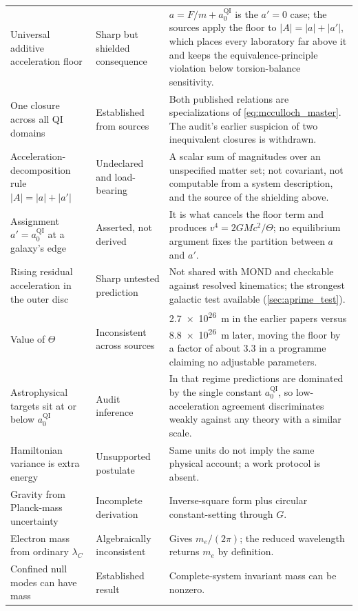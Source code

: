 \documentclass[11pt]{article}
\newcommand{\QI}{\mathrm{QI}}
\begin{document}
\begin{longtable}{>{\raggedright\arraybackslash}p{}>{\raggedright\arraybackslash}p{}>{\raggedright\arraybackslash}p{}}
Universal additive acceleration floor & Sharp but shielded consequence & \(a=F/m+a_{0}^{\QI}\) is the \(a'=0\) case; the sources apply the floor to \(|A|=|a|+|a'|\), which places every laboratory far above it and keeps the equivalence-principle violation below torsion-balance sensitivity. \\
One closure across all QI domains & Established from sources & Both published relations are specializations of \cref{eq:mcculloch_master}. The audit's earlier suspicion of two inequivalent closures is withdrawn. \\
Acceleration-decomposition rule \(|A|=|a|+|a'|\) & Undeclared and load-bearing & A scalar sum of magnitudes over an unspecified matter set; not covariant, not computable from a system description, and the source of the shielding above. \\
Assignment \(a'=a_{0}^{\QI}\) at a galaxy's edge & Asserted, not derived & It is what cancels the floor term and produces \(v^{4}=2GMc^{2}/\Theta\); no equilibrium argument fixes the partition between \(a\) and \(a'\). \\
Rising residual acceleration in the outer disc & Sharp untested prediction & Not shared with MOND and checkable against resolved kinematics; the strongest galactic test available (\cref{sec:aprime_test}). \\
Value of \(\Theta\) & Inconsistent across sources & \SI{2.7e26}{m} in the earlier papers versus \SI{8.8e26}{m} later, moving the floor by a factor of about \(3.3\) in a programme claiming no adjustable parameters. \\
Astrophysical targets sit at or below \(a_{0}^{\QI}\) & Audit inference & In that regime predictions are dominated by the single constant \(a_{0}^{\QI}\), so low-acceleration agreement discriminates weakly against any theory with a similar scale. \\
Hamiltonian variance is extra energy & Unsupported postulate & Same units do not imply the same physical account; a work protocol is absent. \\
Gravity from Planck-mass uncertainty & Incomplete derivation & Inverse-square form plus circular constant-setting through \(G\). \\
Electron mass from ordinary \(\lambda_C\) & Algebraically inconsistent & Gives \(m_e/(2\pi)\); the reduced wavelength returns \(m_e\) by definition. \\
Confined null modes can have mass & Established result & Complete-system invariant mass can be nonzero. \\

\end{longtable}
\end{document}
